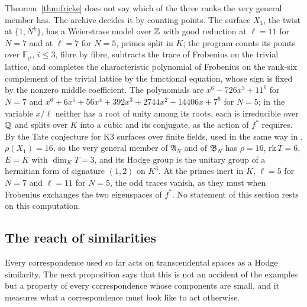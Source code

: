 \begin{remark}\label{rem:frickepicard}
Theorem~\ref{thm:fricke} does not say which of the three ranks the very general member has. The archive decides it by counting points. The surface $X_{1}$, the twist at $\{1,N^{k}\}$, has a Weierstrass model over $\mathbb{Z}$ with good reduction at $\ell=11$ for $N=7$ and at $\ell=7$ for $N=5$, primes split in $K$; the program  counts its points over $\mathbb{F}_{\ell^{i}}$, $i\le3$, fibre by fibre, subtracts the trace of Frobenius on the trivial lattice, and completes the characteristic polynomial of Frobenius on the rank-six complement of the trivial lattice by the functional equation, whose sign is fixed by the nonzero middle coefficient. The polynomials are $x^{6}-726x^{3}+11^{6}$ for $N=7$ and $x^{6}+6x^{5}+56x^{4}+392x^{3}+2744x^{2}+14406x+7^{6}$ for $N=5$; in the variable $x/\ell$ neither has a root of unity among its roots, each is irreducible over $\mathbb{Q}$ and splits over $K$ into a cubic and its conjugate, as the action of $f^{*}$ requires. By the Tate conjecture for K3 surfaces over finite fields, used in the same way in \cite[\S7]{vGS25}, $\rho(X_{1})=16$, so the very general member of $\mathfrak{A}_{N}$ and of $\mathfrak{B}_{N}$ has $\rho=16$, $\mathrm{rk}\,T=6$, $E=K$ with $\dim_{K}T=3$, and its Hodge group is the unitary group of a hermitian form of signature $(1,2)$ on $K^{3}$. At the primes inert in $K$, $\ell=5$ for $N=7$ and $\ell=11$ for $N=5$, the odd traces vanish, as they must when Frobenius exchanges the two eigenspaces of $f^{*}$. No statement of this section rests on this computation.
\end{remark}

\subsection{The reach of similarities}

Every correspondence used so far acts on transcendental spaces as a Hodge similarity. The next proposition says that this is not an accident of the examples but a property of every correspondence whose components are small, and it measures what a correspondence must look like to act otherwise.

